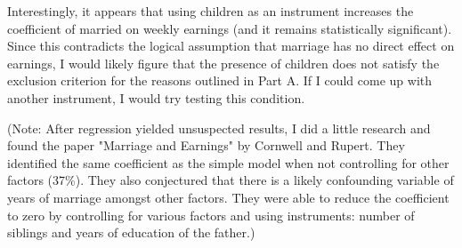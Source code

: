 \documentclass[11pt]{article}
\begin{document}
    Interestingly, it appears that using children as an instrument increases
the coefficient of married on weekly earnings (and it remains
statistically significant). Since this contradicts the logical
assumption that marriage has no direct effect on earnings, I would
likely figure that the presence of children does not satisfy the
exclusion criterion for the reasons outlined in Part A. If I could come
up with another instrument, I would try testing this condition.

(Note: After regression yielded unsuspected results, I did a little
research and found the paper "Marriage and Earnings" by Cornwell and
Rupert. They identified the same coefficient as the simple model when
not controlling for other factors (37\%). They also conjectured that
there is a likely confounding variable of years of marriage amongst
other factors. They were able to reduce the coefficient to zero by
controlling for various factors and using instruments: number of
siblings and years of education of the father.)


    
    
    
    
\end{document}
